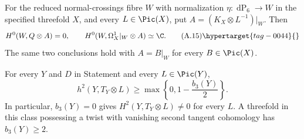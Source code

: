 \begin{proposition}\hypertarget{tag-01AQ}{}\label{cdp:st:A.4.1}


For the reduced normal-crossings fibre $W$ with normalization $\eta:\operatorname{dP}_6\to W$ in the specified threefold $X$, and every $L\in\Pic(X)$, put $A=(K_X\otimes L^{-1})|_W$. Then
\[
H^0(W,Q\otimes A)=0,
\qquad H^0(W,\Omega_X^1|_W\otimes A)\simeq\C.
\tag{A.15}\hypertarget{tag-0044}{}\label{cdp:eq:A.15}
\]
The same two conclusions hold with $A=B|_W$ for every $B\in\Pic(X)$.
\end{proposition}

\begin{proposition}\hypertarget{tag-01BP}{}\label{cdp:st:C.1.3}


For every $Y$ and $D$ in Statement  and every $L\in\Pic(Y)$,
\[
 h^2(Y,T_Y\otimes L)\geq
 \max\left\{0,1-\frac{b_3(Y)}2\right\}.
\]
In particular, $b_3(Y)=0$ gives $H^2(Y,T_Y\otimes L)\ne0$ for
every $L$. A threefold in this class possessing a twist with vanishing
second tangent cohomology has $b_3(Y)\geq2$.
\end{proposition}


